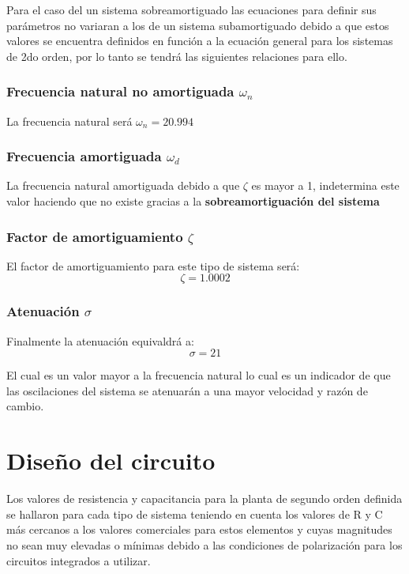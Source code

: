 \documentclass[conference]{IEEEtran}
\begin{document}
	Para el caso del un sistema sobreamortiguado las ecuaciones para definir sus parámetros no variaran a los de un sistema subamortiguado debido a que estos valores se encuentra definidos en función a la ecuación general para los sistemas de 2do orden, por lo tanto se tendrá las siguientes relaciones para ello.
	
	\subsubsection{Frecuencia natural no amortiguada $\omega_n$}
	
	La frecuencia natural será $ \omega_n = 20.994$
	
	\subsubsection{Frecuencia amortiguada $\omega_d$}
	La frecuencia natural amortiguada debido a que $\zeta$ es mayor a 1, indetermina este valor haciendo que no existe gracias a la \textbf{sobreamortiguación del sistema}
	
	\subsubsection{Factor de amortiguamiento $\zeta$}
	El factor de amortiguamiento para este tipo de sistema será:
	\begin{equation}
		\zeta = 1.0002
		\label{eq:sobre-factor-amortiguamiento}
	\end{equation}
	
	\subsubsection{Atenuación $\sigma$}
	Finalmente la atenuación equivaldrá a:
	\begin{equation}
		\sigma = 21
	\end{equation}
	
	El cual es un valor mayor a la frecuencia natural lo cual es un indicador de que las oscilaciones del sistema se atenuarán a una mayor velocidad y razón de cambio.
	
	\section{Diseño del circuito}
	Los valores de resistencia y capacitancia para la planta de segundo orden definida se hallaron para cada tipo de sistema teniendo en cuenta los valores de R y C más cercanos a los valores comerciales para estos elementos y cuyas magnitudes no sean muy elevadas o mínimas debido a las condiciones de polarización para los circuitos integrados a utilizar.
	
\end{document}
